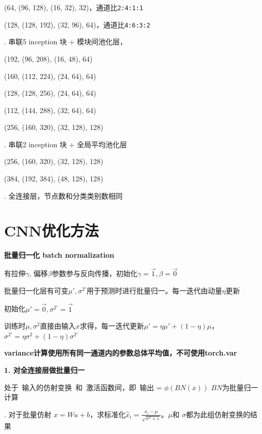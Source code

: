 \documentclass[UTF8]{ctexart}
\begin{document}
  \quad \quad (64, (96, 128), (16, 32), 32)，通道比\texttt{2:4:1:1}

  \quad \quad (128, (128, 192), (32, 96), 64)，通道比\texttt{4:6:3:2}

  . 串联5 inception 块 + 模块间池化层，

  \quad \quad (192, (96, 208), (16, 48), 64)

  \quad \quad (160, (112, 224), (24, 64), 64)

  \quad \quad (128, (128, 256), (24, 64), 64)

  \quad \quad (112, (144, 288), (32, 64), 64)

  \quad \quad (256, (160, 320), (32, 128), 128)

  . 串联2 inception 块 + 全局平均池化层

  \quad \quad (256, (160, 320), (32, 128), 128)

  \quad \quad (384, (192, 384), (48, 128), 128)

  . 全连接层，节点数和分类类别数相同

\section{CNN优化方法}
\noindent \textbf{批量归一化 batch normalization}

  有拉伸$\gamma$, 偏移$\beta$参数参与反向传播，初始化$\gamma = \vec{1}, \beta = \vec{0}$

  批量归一化层有可变$\mu', \sigma^{2'}$用于预测时进行批量归一。每一迭代由动量$\eta$更新
  
  \quad 初始化$\mu' = \vec{0}, \sigma^{2'} = \vec{1}$

  \quad 训练时$\mu, \sigma^2$直接由输入$x$求得，每一迭代更新$\mu' = \eta\mu' + (1 - \eta)\mu$，$\sigma^{2'} = \eta\sigma^2 + (1 - \eta)\sigma^{2'}$

  \quad \textbf{variance计算使用所有同一通道内的参数总体平均值，不可使用torch.var}

  \textbf{1. 对全连接层做批量归一}

  \quad 处于\ 输入的仿射变换\ 和\ 激活函数间，即\ 输出 = $\phi (BN(x))$ $BN$为批量归一计算

  . 对于批量仿射 $x = Wu + b$，求标准化$\hat{x}_i = \frac{{x_i} - \mu}{\sqrt{\sigma^2 + \varepsilon }}$。$\mu $和 $\sigma$都为此组仿射变换的结果
\end{document}

